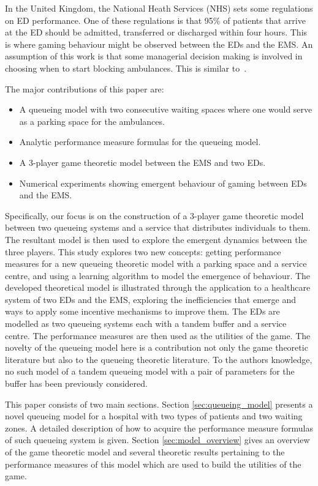 In the United Kingdom, the National Heath Services (NHS) sets some regulations 
on ED performance.
One of these regulations is that 95\% of patients that arrive at the ED should 
be admitted, transferred or discharged within four hours.
This is where gaming behaviour might be observed between the EDs and the EMS.
An assumption of this work is that some managerial decision making is involved
in choosing when to start blocking ambulances.
This is similar to~\cite{deo2011centralized}.

The major contributions of this paper are:
\begin{itemize}
    \item A queueing model with two consecutive waiting spaces where one would 
    serve as a parking space for the ambulances.
    \item Analytic performance measure formulas for the queueing model.
    \item A 3-player game theoretic model between the EMS and two EDs.
    \item Numerical experiments showing emergent behaviour of gaming between
    EDs and the EMS.
\end{itemize}
Specifically, our focus is on the construction of a 3-player game theoretic 
model between two queueing systems and a service that distributes individuals
to them. 
The resultant model is then used to explore the emergent dynamics between 
the three players.
This study explores two new concepts: getting performance measures for a new
queueing theoretic model with a parking space and a service centre, and
using a learning algorithm to model the emergence of behaviour.
The developed theoretical model is illustrated through the application to 
a healthcare system of two EDs and the EMS, exploring the inefficiencies that 
emerge and ways to apply some incentive mechanisms to improve them.
The EDs are modelled as two queueing systems each with a tandem buffer and a 
service centre.
The performance measures are then used as the utilities of the game.
The novelty of the queueing model here is a contribution not only the game 
theoretic literature but also to the queueing theoretic literature.
To the authors knowledge, no such model of a tandem queueing model with a pair 
of parameters for the buffer has been previously considered.

This paper consists of two main sections.
Section \ref{sec:queueing_model} presents a novel queueing model for a hospital
with two types of patients and two waiting zones.
A detailed description of how to acquire the performance measure formulas of 
such queueing system is given.
Section \ref{sec:model_overview} gives an overview of the game theoretic model
and several
theoretic results pertaining to the performance measures of this model which 
are used to build the utilities of the game.
